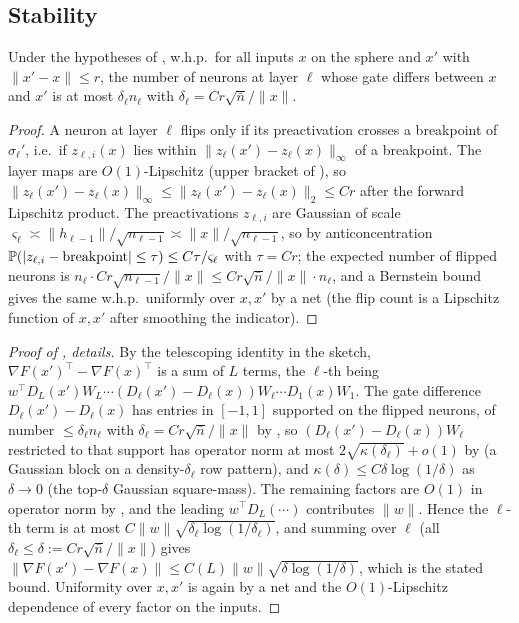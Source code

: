 \subsection{Stability}
\begin{lemma}\label{lem:fewflip}
Under the hypotheses of , w.h.p.\ for all inputs $x$ on the sphere and $x'$ with
$\|x'-x\|\le r$, the number of neurons at layer $\ell$ whose gate differs between $x$ and $x'$ is at most
$\delta_\ell n_\ell$ with $\delta_\ell=C r\sqrt{\bar n}/\|x\|$.
\end{lemma}
\begin{proof}
A neuron at layer $\ell$ flips only if its preactivation crosses a breakpoint of $\sigma_\ell'$, i.e.\ if
$z_{\ell,i}(x)$ lies within $\|z_\ell(x')-z_\ell(x)\|_\infty$ of a breakpoint. The layer maps are
$O(1)$-Lipschitz (upper bracket of ), so $\|z_\ell(x')-z_\ell(x)\|_\infty\le\|z_\ell(x')-z_\ell(x)\|_2\le Cr$
after the forward Lipschitz product. The preactivations $z_{\ell,i}$ are Gaussian of scale
$\varsigma_\ell\asymp\|h_{\ell-1}\|/\sqrt{n_{\ell-1}}\asymp\|x\|/\sqrt{n_{\ell-1}}$, so by anticoncentration
$\mathbb{P}(|z_{\ell,i}-\text{breakpoint}|\le\tau)\le C\tau/\varsigma_\ell$ with $\tau=Cr$; the expected number of
flipped neurons is $n_\ell\cdot Cr\sqrt{n_{\ell-1}}/\|x\|\le C r\sqrt{\bar n}/\|x\|\cdot n_\ell$, and a
Bernstein bound gives the same w.h.p.\ uniformly over $x,x'$ by a net (the flip count is a Lipschitz
function of $x,x'$ after smoothing the indicator).
\end{proof}

\begin{proof}[Proof of , details]
By the telescoping identity in the sketch, $\nabla F(x')^\top-\nabla F(x)^\top$ is a sum of $L$ terms, the
$\ell$-th being $w^\top D_L(x')W_L\cdots(D_\ell(x')-D_\ell(x))W_\ell\cdots D_1(x)W_1$. The gate difference
$D_\ell(x')-D_\ell(x)$ has entries in $[-1,1]$ supported on the flipped neurons, of number
$\le\delta_\ell n_\ell$ with $\delta_\ell=Cr\sqrt{\bar n}/\|x\|$ by , so
$(D_\ell(x')-D_\ell(x))W_\ell$ restricted to that support has operator norm at most
$2\sqrt{\kappa(\delta_\ell)}+o(1)$ by  (a Gaussian block on a density-$\delta_\ell$ row
pattern), and $\kappa(\delta)\le C\delta\log(1/\delta)$ as $\delta\to0$ (the top-$\delta$ Gaussian
square-mass). The remaining factors are $O(1)$ in operator norm by , and the
leading $w^\top D_L(\cdots)$ contributes $\|w\|$. Hence the $\ell$-th term is at most
$C\|w\|\sqrt{\delta_\ell\log(1/\delta_\ell)}$, and summing over $\ell$ (all $\delta_\ell\le\delta:=Cr\sqrt{\bar n}/\|x\|$)
gives $\|\nabla F(x')-\nabla F(x)\|\le C(L)\|w\|\sqrt{\delta\log(1/\delta)}$, which is the stated bound.
Uniformity over $x,x'$ is again by a net and the $O(1)$-Lipschitz dependence of every factor on the
inputs.
\end{proof}

